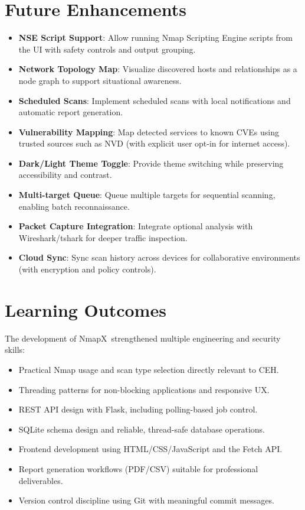 \documentclass[12pt, a4paper]{report}
\newcommand{\NmapX}{NmapX}
\begin{document}
\section{Future Enhancements}
\begin{itemize}[leftmargin=2.2em]
  \item \textbf{NSE Script Support}: Allow running Nmap Scripting Engine scripts from the UI with safety controls and output grouping.
  \item \textbf{Network Topology Map}: Visualize discovered hosts and relationships as a node graph to support situational awareness.
  \item \textbf{Scheduled Scans}: Implement scheduled scans with local notifications and automatic report generation.
  \item \textbf{Vulnerability Mapping}: Map detected services to known CVEs using trusted sources such as NVD (with explicit user opt-in for internet access).
  \item \textbf{Dark/Light Theme Toggle}: Provide theme switching while preserving accessibility and contrast.
  \item \textbf{Multi-target Queue}: Queue multiple targets for sequential scanning, enabling batch reconnaissance.
  \item \textbf{Packet Capture Integration}: Integrate optional analysis with Wireshark/tshark for deeper traffic inspection.
  \item \textbf{Cloud Sync}: Sync scan history across devices for collaborative environments (with encryption and policy controls).
\end{itemize}

\section{Learning Outcomes}
The development of \NmapX\ strengthened multiple engineering and security skills:
\begin{itemize}[leftmargin=2.2em]
  \item Practical Nmap usage and scan type selection directly relevant to CEH.
  \item Threading patterns for non-blocking applications and responsive UX.
  \item REST API design with Flask, including polling-based job control.
  \item SQLite schema design and reliable, thread-safe database operations.
  \item Frontend development using HTML/CSS/JavaScript and the Fetch API.
  \item Report generation workflows (PDF/CSV) suitable for professional deliverables.
  \item Version control discipline using Git with meaningful commit messages.
\end{itemize}
\end{document}
